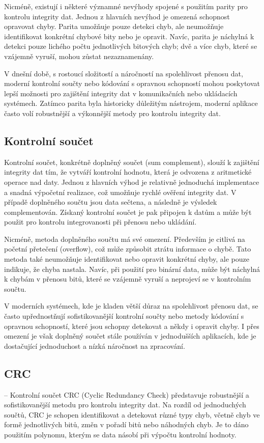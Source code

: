 \documentclass[12pt]{report}
\begin{document}
    Nicméně, existují i některé významné nevýhody spojené s použitím parity pro kontrolu integrity dat. Jednou z hlavních nevýhod je omezená schopnost opravovat chyby. Parita umožňuje pouze detekci chyb, ale neumožňuje identifikovat konkrétní chybové bity nebo je opravit. Navíc, parita je náchylná k detekci pouze lichého počtu jednotlivých bitových chyb; dvě a více chyb, které se vzájemně vyruší, mohou zůstat nezaznamenány.

    V dnešní době, s rostoucí složitostí a náročností na spolehlivost přenosu dat, moderní kontrolní součty nebo kódování s opravnou schopností mohou poskytovat lepší možnosti pro zajištění integrity dat v komunikačních nebo ukládacích systémech. Zatímco parita byla historicky důležitým nástrojem, moderní aplikace často volí robustnější a výkonnější metody pro kontrolu integrity dat.
    \cite{Checksum4:online}
\subsection{ Kontrolní součet}
Kontrolní součet, konkrétně doplněný součet (sum complement), slouží k zajištění integrity dat tím, že vytváří kontrolní hodnotu, která je odvozena z aritmetické operace nad daty. Jednou z hlavních výhod je relativně jednoduchá implementace a snadná výpočetní realizace, což umožňuje rychlé ověření integrity dat. V případě doplněného součtu jsou data sečtena, a následně je výsledek complementován. Získaný kontrolní součet je pak připojen k datům a může být použit pro kontrolu integrovanosti při přenosu nebo ukládání.

    Nicméně, metoda doplněného součtu má své omezení. Především je citlivá na početní přetečení (overflow), což může způsobit ztrátu informace o chybě. Tato metoda také neumožňuje identifikovat nebo opravit konkrétní chyby, ale pouze indikuje, že chyba nastala. Navíc, při použití pro binární data, může být náchylná k chybám v přenosu bitů, které se vzájemně vyruší a neprojeví se v kontrolním součtu.

    V moderních systémech, kde je kladen větší důraz na spolehlivost přenosu dat, se často upřednostňují sofistikovanější kontrolní součty nebo metody kódování s opravnou schopností, které jsou schopny detekovat a někdy i opravit chyby. I přes omezení je však doplněný součet stále používán v jednodušších aplikacích, kde je dostačující jednoduchost a nízká náročnost na zpracování.
   \cite{Checksum4:online}
\subsection{CRC}
    -- Kontrolní součet CRC (Cyclic Redundancy Check) představuje robustnější a sofistikovanější metodu pro kontrolu integrity dat. Na rozdíl od jednoduchých součtů, CRC je schopen identifikovat a detekovat různé typy chyb, včetně chyb ve formě jednotlivých bitů, změn v pořadí bitů nebo náhodných chyb. Je to dáno použitím polynomu, kterým se data násobí při výpočtu kontrolní hodnoty.
\end{document}
